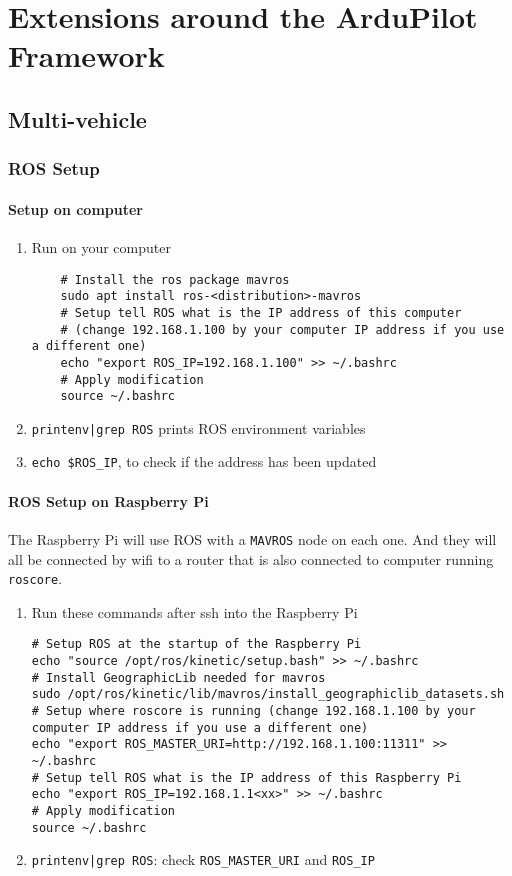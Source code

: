 \chapter{Extensions around the ArduPilot Framework}

\section{Multi-vehicle}

\subsection{ROS Setup}
\subsubsection{Setup on computer}
\begin{enumerate}
    \item Run on your computer

          \begin{verbatim}
    # Install the ros package mavros
    sudo apt install ros-<distribution>-mavros
    # Setup tell ROS what is the IP address of this computer
    # (change 192.168.1.100 by your computer IP address if you use a different one)
    echo "export ROS_IP=192.168.1.100" >> ~/.bashrc
    # Apply modification
    source ~/.bashrc
                    \end{verbatim}
    \item \texttt{printenv|grep ROS} prints ROS environment variables
    \item \texttt{echo \$ROS\_IP}, to check if the address has been updated
\end{enumerate}

\subsubsection{ROS Setup on Raspberry Pi}

The Raspberry Pi will use ROS with a \texttt{MAVROS} node on each one. And they will all be connected by wifi to a router that is also connected to computer running \texttt{roscore}.
\begin{enumerate}
    \item Run these commands after ssh into the Raspberry Pi

          \begin{verbatim}
# Setup ROS at the startup of the Raspberry Pi
echo "source /opt/ros/kinetic/setup.bash" >> ~/.bashrc
# Install GeographicLib needed for mavros
sudo /opt/ros/kinetic/lib/mavros/install_geographiclib_datasets.sh
# Setup where roscore is running (change 192.168.1.100 by your computer IP address if you use a different one)
echo "export ROS_MASTER_URI=http://192.168.1.100:11311" >> ~/.bashrc
# Setup tell ROS what is the IP address of this Raspberry Pi
echo "export ROS_IP=192.168.1.1<xx>" >> ~/.bashrc
# Apply modification
source ~/.bashrc
                    \end{verbatim}
    \item \texttt{printenv|grep ROS}: check \texttt{ROS\_MASTER\_URI} and \texttt{ROS\_IP}
\end{enumerate}

